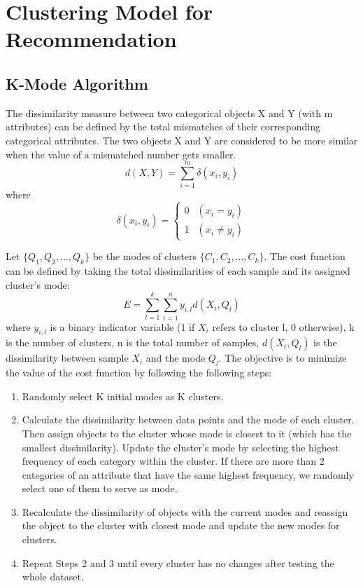 \documentclass[12pt]{article}
\begin{document}
\section{Clustering Model for Recommendation}
\subsection{K-Mode Algorithm}
The dissimilarity measure between two categorical objects X and Y (with m attributes) can be defined by the total mismatches of their corresponding categorical attributes. The two objects X and Y are considered to be more similar when the value of a mismatched number gets smaller.\citep{huang1998extensions}
        $$d(X,Y) = \sum_{i=1}^{m}\delta{(x_i,y_i)}$$ where $$\delta{(x_i,y_i)} = \left\{\begin{array}{ll} 0 & (x_i = y_i) \\
        1 & (x_i \neq y_i)\end{array}\right.$$

\vspace{0.5cm}

Let $\{Q_1,Q_2,...,Q_k\}$ be the modes of clusters $\{C_1,C_2,...,C_k\}$. The cost function can be defined by taking the total dissimilarities of each sample and its assigned cluster's mode\citep{huang1998extensions}: 
$$E = \sum_{l=1}^{k}\sum_{i=1}^{n}y_{i,l}d(X_i,Q_l)$$ 
where $y_{i,l}$ is a binary indicator variable (1 if $X_i$ refers to cluster l, 0 otherwise), k is the number of clusters, n is the total number of samples, $d(X_i,Q_l)$ is the dissimilarity between sample $X_i$ and the mode $Q_l$. The objective is to minimize the value of the cost function by following the following steps: 

\begin{enumerate}
    \item Randomly select K initial modes as K clusters.
    
    \item Calculate the dissimilarity between data points and the mode of each cluster. Then assign objects to the cluster whose mode is closest to it (which has the smallest dissimilarity). Update the cluster’s mode by selecting the highest frequency of each category within the cluster. If there are more than 2 categories of an attribute that have the same highest frequency, we randomly select one of them to serve as mode.
    
    \item Recalculate the dissimilarity of objects with the current modes and reassign the object to the cluster with closest mode and update the new modes for clusters.
    
    \item Repeat Steps 2 and 3 until every cluster has no changes after testing the whole dataset.
\end{enumerate}
\end{document}

